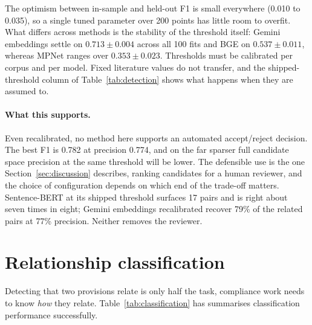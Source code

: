 The optimism between in-sample and held-out F1 is small everywhere (0.010 to
0.035), so a single tuned parameter over 200 points has little room to overfit.
What differs across methods is the stability of the threshold itself: Gemini
embeddings settle on $0.713 \pm 0.004$ across all 100 fits and BGE on
$0.537 \pm 0.011$, whereas MPNet ranges over $0.353 \pm 0.023$. Thresholds must be
calibrated per corpus and per model. Fixed literature values do not transfer, and
the shipped-threshold column of Table~\ref{tab:detection} shows what happens when
they are assumed to.

\paragraph{What this supports.} Even recalibrated, no method here supports an
automated accept/reject decision. The best F1 is 0.782 at precision 0.774, and on
the far sparser full candidate space precision at the same threshold will be
lower. The defensible use is the one Section~\ref{sec:discussion} describes,
ranking candidates for a human reviewer, and the choice of configuration depends
on which end of the trade-off matters. Sentence-BERT at its shipped threshold
surfaces 17 pairs and is right about seven times in eight; Gemini embeddings
recalibrated recover 79\% of the related pairs at 77\% precision. Neither removes
the reviewer.

\section{Relationship classification}\label{sec:classresults}

Detecting that two provisions relate is only half the task, compliance work
needs to know \emph{how} they relate. Table~\ref{tab:classification}
has summarises classification performance successfully. 

